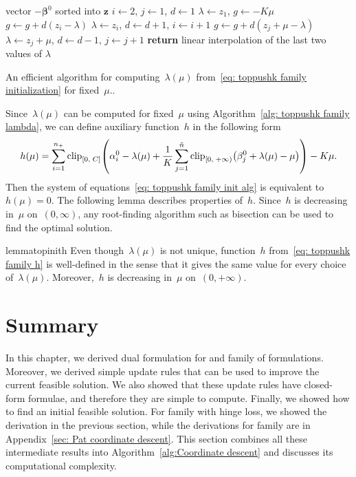 \begin{algorithm}
  \centering
  \begin{algorithmic}[1]
    \Require vector $-\bm{\beta}^0$ sorted into $\bm{z}$
    \State $i \gets 2$, $j \gets 1$, $d \gets 1$
    \State $\lambda \gets z_1$, $g \gets - K\mu$
        \State $g \gets g + d(z_i - \lambda)$
        \State $\lambda\gets z_i$, $d \gets d+1$, $i \gets i+1$
      \Else
        \State $g \gets g + d(z_j + \mu - \lambda)$
        \State $\lambda \gets z_j + \mu$, $d \gets d - 1$, $j \gets j + 1$
      \EndIf
    \EndWhile
    \State \textbf{return} linear interpolation of the last two values of $\lambda$
  \end{algorithmic}
  \caption{An efficient algorithm for computing~$\lambda(\mu)$ from~\eqref{eq: toppushk family initialization} for fixed~$\mu.$.}
  \label{alg: toppushk family lambda}
\end{algorithm}

Since~$\lambda(\mu)$ can be computed for fixed~$\mu$ using Algorithm~\ref{alg: toppushk family lambda}, we can define auxiliary function~$h$ in the following form
\begin{equation}\label{eq: toppushk family h}
  h(\mu)
    = \sum_{i=1}^{\npos} \clip{0}{C}{\alpha_i^0 - \lambda(\mu) + \frac{1}{K} \sum_{j=1}^{\ntil} \clip[u]{0}{+\infty}{\beta_j^0+\lambda(\mu) - \mu}} - K \mu.
\end{equation}
Then the system of equations~\eqref{eq: toppushk family init alg} is equivalent to~$h(\mu) = 0.$ The following lemma describes properties of~$h.$ Since~$h$ is decreasing in~$\mu$ on~$(0, \infty)$, any root-finding algorithm such as bisection can be used to find the optimal solution.

\begin{restatable}{lemma}{topinith}\label{lemma: toppushk family h}
  Even though~$\lambda(\mu)$ is not unique, function~$h$ from~\eqref{eq: toppushk family h} is well-defined in the sense that it gives the same value for every choice of~$\lambda(\mu)$. Moreover,~$h$ is decreasing in~$\mu$ on~$(0, + \infty)$.
\end{restatable}

\section{Summary}

In this chapter, we derived dual formulation for \TopPushK and \PatMat family of formulations. Moreover, we derived simple update rules that can be used to improve the current feasible solution. We also showed that these update rules have closed-form formulae, and therefore they are simple to compute. Finally, we showed how to find an initial feasible solution. For \TopPushK family with hinge loss, we showed the derivation in the previous section, while the derivations for \PatMat family are in Appendix~\ref{sec: Pat coordinate descent}. This section combines all these intermediate results into Algorithm~\ref{alg:Coordinate descent} and discusses its computational complexity.

